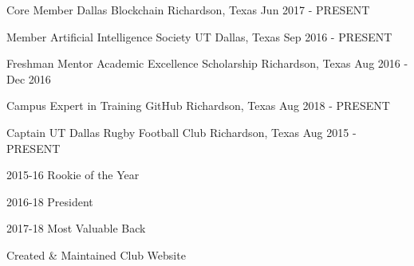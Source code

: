 

\begin{cventries}

  \cventry
    {Core Member} %
    {Dallas Blockchain} %
    {Richardson, Texas} %
    {Jun 2017 - PRESENT} %
    {
      \begin{cvitems} %
      \end{cvitems}
    }

  \cventry
    {Member} %
    {Artificial Intelligence Society} %
    {UT Dallas, Texas} %
    {Sep 2016 - PRESENT} %
    {
      \begin{cvitems} %
      \end{cvitems}
    }

  \cventry
    {Freshman Mentor} %
    {Academic Excellence Scholarship} %
    {Richardson, Texas} %
    {Aug 2016 - Dec 2016} %
    {
      \begin{cvitems} %
      \end{cvitems}
    }

  \cventry
    {Campus Expert in Training} %
    {GitHub} %
    {Richardson, Texas} %
    {Aug 2018 - PRESENT} %
    {
      \begin{cvitems} %
      \end{cvitems}
    }

  \cventry
    {Captain} %
    {UT Dallas Rugby Football Club} %
    {Richardson, Texas} %
    {Aug 2015 - PRESENT} %
    {
      \begin{cvitems} %
        \item {2015-16 Rookie of the Year}
        \item {2016-18 President}
        \item {2017-18 Most Valuable Back}
        \item {Created \& Maintained Club Website}
      \end{cvitems}
    }

\end{cventries}
